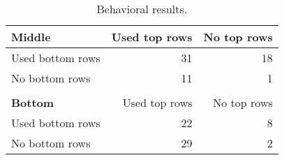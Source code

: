 \documentclass[10pt,letterpaper]{article}
\begin{document}
\begin{table}[!ht]
\begin{center} 
\caption{Behavioral results.} 
\label{table:subset-table} 
\vskip 0.12in
\begin{tabular}{ l r r}
    \textbf{Middle}         & Used top rows & No top rows \\
    \hline
    Used bottom rows        &  31 & 18  \\
    No bottom rows          &  11 &  1  \\
    \\
    \textbf{Bottom}         & Used top rows & No top rows \\
    \hline
    Used bottom rows        & 22 & 8 \\
    No bottom rows          & 29 & 2 \\
\end{tabular}
\end{center} 
\end{table}




% 
% 
\end{document}
